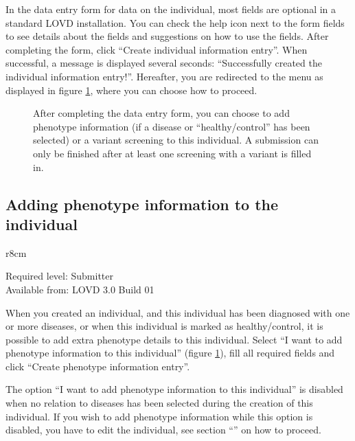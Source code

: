In the data entry form for data on the individual, most fields are optional in a standard LOVD installation.
You can check the help icon next to the form fields to see details
 about the fields and suggestions on how to use the fields.
After completing the form, click ``Create individual information entry''.
When successful, a message is displayed several seconds: ``Successfully created the individual information entry!''.
Hereafter, you are redirected to the menu as displayed in figure \ref{fig:submission_of_individual}, where you can
 choose how to proceed.
\clearpage

\begin{figure}[ht]
  \begin{shaded}
  \hypertarget{fig:submission_of_individual}{}
  \caption{%
    After completing the data entry form, you can choose to add phenotype information
     (if a disease or ``healthy/control'' has been selected) or a variant screening to this individual.
    A submission can only be finished after at least one screening with a variant is filled in.}
  \label{fig:submission_of_individual}
  \end{shaded}
\end{figure}



\hypertarget{ssec:add_phenotype_information_to_an_individual}{}
\subsection{Adding phenotype information to the individual}
\begin{wrapfigure}[3]{r}{8cm} %
  \vspace{-25pt}
  \begin{leftbar}
    Required level: Submitter\\
    Available from: LOVD 3.0 Build 01
  \end{leftbar}
\end{wrapfigure}
When you created an individual, and this individual has been diagnosed with one or more diseases,
 or when this individual is marked as healthy/control, it is possible to add extra phenotype details to
 this individual.
Select ``I want to add phenotype information to this individual'' (figure \ref{fig:submission_of_individual}),
 fill all required fields and click ``Create phenotype information entry''.

The option ``I want to add phenotype information to this individual'' is disabled when no relation to
 diseases has been selected during the creation of this individual.
If you wish to add phenotype information while this option is disabled, you have to edit the individual, see
 section ``'' on how to proceed.



